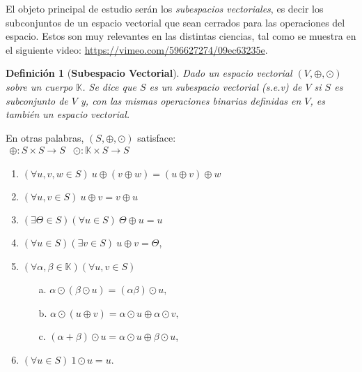 \documentclass[12pt]{book}
\newtheorem{defi}{Definici\'on}
\def\K{\mathbb{K}}
\begin{document}
El objeto principal de estudio serán los {\em subespacios vectoriales}, es decir los subconjuntos de un espacio vectorial que sean cerrados para las operaciones del espacio.
Estos son muy relevantes en las distintas ciencias, tal como se muestra en el siguiente video: \url{https://vimeo.com/596627274/09ec63235e}.

\begin{defi}[\textbf{Subespacio Vectorial}] Dado un espacio vectorial $(V,\oplus,\odot)$ sobre un cuerpo $\K$. Se dice que $S$ es un \emph{subespacio vectorial (s.e.v) de $V$} si $S$ es subconjunto de $V$ y, con las mismas operaciones binarias definidas en $V$, es tambi\'en un espacio vectorial. 
\end{defi}

En otras palabras, $(S,\oplus,\odot)$ satisface:\\

\hspace{2.5 cm}$\begin{array}{l}
 \oplus:S\times S\rightarrow S 
\end{array}$\hspace{5 cm}$\begin{array}{l}
\odot:\K\times S\rightarrow S
\end{array}$

\begin{multicols}{2}
\begin{enumerate}
\item $(\forall u,v,w\in S)\ u\oplus (v\oplus w)=(u\oplus v)\oplus w$
\item\label{conmut} $(\forall u,v\in S)\ u\oplus v=v\oplus u$
\item $(\exists \Theta\in S)(\forall u\in S)\ \Theta\oplus u=u$
\item $(\forall u\in S)(\exists v\in S)\ u\oplus v=\Theta$,
\item $(\forall \alpha, \beta\in \K)(\forall u,v\in S)$
  \begin{enumerate}
  \item[a.] $ \alpha\odot(\beta\odot u)=(\alpha\beta)\odot u, $
  \item[b.] $\alpha\odot(u\oplus v)=\alpha\odot u\oplus \alpha\odot v,$
  \item[c.] $(\alpha+\beta)\odot u=\alpha\odot u\oplus \beta\odot u$,
  \end{enumerate}
\item $(\forall u\in S)\ 1\odot u=u$.
\end{enumerate}
\end{multicols}
\end{document}
